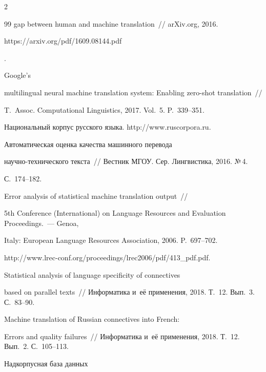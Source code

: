 \begin{multicols}{2}
{{\begin{thebibliography}{99}
gap between human and machine translation~// arXiv.org, 2016. {\sf 


https://arxiv.org/pdf/1609.08144.pdf}.




 Google's 


multilingual neural machine translation system: Enabling zero-shot translation~// 


T.~Assoc. Computational Linguistics, 2017. Vol.~5. P.~339--351.




Национальный корпус русского языка. {\sf http://\linebreak www.ruscorpora.ru}.




 Автоматическая оценка качества машинного перевода  


на\-уч\-но-тех\-ни\-че\-ско\-го текста~// Вестник МГОУ. Сер. Лингвистика, 2016. №\,4. 


С.~174--182.




 Error analysis of statistical machine translation output~// 


5th Conference (International) on Language Resources and Evaluation Proceedings.~--- Genoa, 


Italy: European Language Resources Association, 2006. P.~697--702. 


{\sf http://www.lrec-conf.org/proceedings/lrec2006/pdf/413\_pdf.pdf}.




 Statistical analysis of language specificity of connectives 


based on parallel texts~// Информатика и~её применения, 2018. Т.~12. Вып.~3. С.~83--90.




 Machine translation of Russian connectives into French: 


Errors and quality failures~// Информатика и~её применения, 2018. Т.~12. Вып.~2. С.~105--113.




 Надкорпусная база данных 



\end{thebibliography}}}
\end{multicols}
